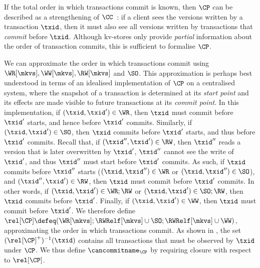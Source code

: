 

\label{para:cp}
If the total order in which transactions commit is known, then \(\CP\)
can be described as a strengthening of \(\CC\)~\cite{laws}: 
if a client sees the versions written by a transaction \(\txid\),
then it must also see all versions written by transactions that \emph{commit} before \(\txid\). 
Although kv-stores only provide \emph{partial} information about the
order of  transaction commits, 
this is sufficient to formalise $\CP$.

We can approximate the order in which transactions 
commit using \(\WR[\mkvs], \allowbreak \WW[\mkvs], \allowbreak \RW[\mkvs]\) and \(\SO\). 
This approximation is perhaps best understood in terms of an idealised implementation of \(\CP\) on a centralised system,
where the snapshot of a transaction is determined at its \emph{start point} and its effects are made visible to future transactions at its \emph{commit point}.
In this implementation, if \((\txid,\txid') \in \WR\), then 
\(\txid\) must commit before \(\txid'\) starts, and hence before \(\txid'\) commits.
Similarly, if \((\txid,\txid') \in \SO\), then \(\txid\) commits before \(\txid'\) starts, 
and thus before \(\txid'\) commits.
Recall that, if \((\txid'', \txid') \in \RW\),
then \(\txid''\) reads a version that is later overwritten by
\(\txid'\), \ie \(\txid''\) cannot see the write of \(\txid'\), and thus \(\txid''\) must start before 
\(\txid'\) commits. 
As such, if \(\txid\) commits before \(\txid''\) starts 
(\((\txid, \txid'') \in \WR\) or \((\txid,\txid'') \in \SO\)), 
and \((\txid'', \txid') \in \RW\), then \(\txid\) must commit before 
\(\txid'\) commits. 
In other words, if \((\txid,\txid') \in \WR;\RW\) or \((\txid,\txid') \in \SO;\RW\), then \(\txid\) commits before \(\txid'\).
Finally, if \((\txid,\txid') \in\WW\), then \(\txid\) must commit before \(\txid'\). 
We therefore define \(\rel[\CP] \defeq (\WR[\mkvs]; \RWRelf[\mkvs] \cup \SO;  \RWRelf[\mkvs] \cup \WW)\), approximating the order in which transactions commit. 
%
As shown in \citet{laws}, the set \((\rel[\CP]^{+})^{-1}(\txid)\) contains all transactions that must be observed by \(\txid\) under \(\CP\). 
We thus define \(\cancommitname_{\CP}\) by requiring closure with
respect to \(\rel[\CP]\).

